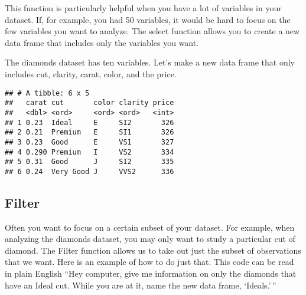 \documentclass[]{article}
\newenvironment{Shaded}{\begin{snugshade}}{\end{snugshade}}
\newcommand{\KeywordTok}[1]{\textcolor[rgb]{0.13,0.29,0.53}{\textbf{#1}}}
\newcommand{\StringTok}[1]{\textcolor[rgb]{0.31,0.60,0.02}{#1}}
\newcommand{\OperatorTok}[1]{\textcolor[rgb]{0.81,0.36,0.00}{\textbf{#1}}}
\newcommand{\NormalTok}[1]{#1}
\begin{document}
This function is particularly helpful when you have a lot of variables
in your dataset. If, for example, you had 50 variables, it would be hard
to focus on the few variables you want to analyze. The select function
allows you to create a new data frame that includes only the variables
you want.

The diamonds dataset has ten variables. Let's make a new data frame that
only includes cut, clarity, carat, color, and the price.

\begin{Shaded}
\end{Shaded}

\begin{verbatim}
## # A tibble: 6 x 5
##   carat cut       color clarity price
##   <dbl> <ord>     <ord> <ord>   <int>
## 1 0.23  Ideal     E     SI2       326
## 2 0.21  Premium   E     SI1       326
## 3 0.23  Good      E     VS1       327
## 4 0.290 Premium   I     VS2       334
## 5 0.31  Good      J     SI2       335
## 6 0.24  Very Good J     VVS2      336
\end{verbatim}

\subsection{Filter}\label{filter}

Often you want to focus on a certain subset of your dataset. For
example, when analyzing the diamonds dataset, you may only want to study
a particular cut of diamond. The Filter function allows us to take out
just the subset of observations that we want. Here is an example of how
to do just that. This code can be read in plain English ``Hey computer,
give me information on only the diamonds that have an Ideal cut. While
you are at it, name the new data frame, `Ideals.'\,''

\begin{Shaded}
\end{Shaded}
\end{document}
